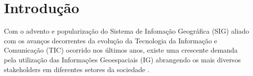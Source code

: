 \documentclass[preprint,authoryear,12pt]{elsarticle}
\begin{document}
\section{Introdu\c{c}\~ao}
\label{sec1}
\begin{multicols}{2}
Com o advento e populariza\c{c}\~ao do Sistema de Infoma\c{c}\~ao Geogr\'afica (SIG) aliado com os avan\c{c}os decorrentes da evolu\c{c}\~ao da Tecnologia da Informa\c{c}\~ao e Comunicação (TIC) ocorrido nos \'ultimos anos, existe uma crescente demanda pela utiliza\c{c}\~ao das Informa\c{c}\~oes Geoespaciais (IG) abrangendo os mais diversos stakeholders em diferentes setores da sociedade \citep{Macharis2014AFlanders, Kounadi2016AdaptiveDatasets}.




\end{multicols}
\end{document}
